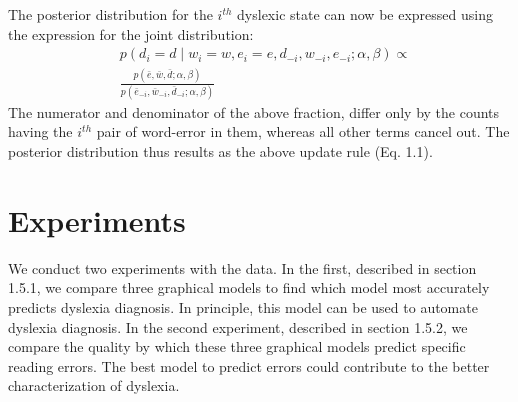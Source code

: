 The posterior distribution for the $i^{th}$ dyslexic state can now be expressed using the expression for the joint distribution:
\begin{equation*}
\begin{split}
&p(d_i=d\mid w_i=w, e_i=e, d_{-i}, w_{-i}, e_{-i}; \alpha, \beta) \propto \\
&\frac{p(\bar{e},\bar{w},\bar{d};\alpha,\beta)}{p(\bar{e}_{-i},\bar{w}_{-i},\bar{d}_{-i};\alpha,\beta)}
\end{split}
\end{equation*}
The numerator and denominator of the above fraction, differ only by the counts having the $i^{th}$ pair of word-error in them, whereas all other terms cancel out. The posterior distribution thus results as the above update rule (Eq. 1.1).

\section{Experiments}
We conduct two experiments with the data. In the first, described in section 1.5.1, we compare three graphical models to find which model most accurately predicts dyslexia diagnosis. In principle, this model can be used to automate dyslexia diagnosis. In the second experiment, described in section 1.5.2, we compare the quality by which these three graphical models predict specific reading errors. The best model to predict errors could contribute to the better characterization of dyslexia.


